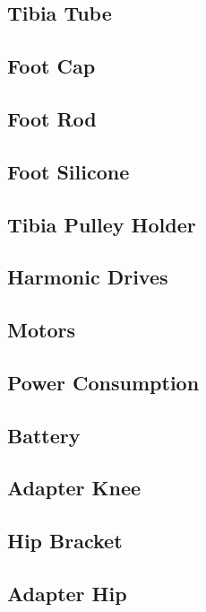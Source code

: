 \subsection{Tibia Tube}

\subsection{Foot Cap}

\subsection{Foot Rod}

\subsection{Foot Silicone}

\subsection{Tibia Pulley Holder}

\subsection{Harmonic Drives}

\subsection{Motors}

\subsection{Power Consumption}

\subsection{Battery}

\subsection{Adapter Knee}

\subsection{Hip Bracket}

\subsection{Adapter Hip}

